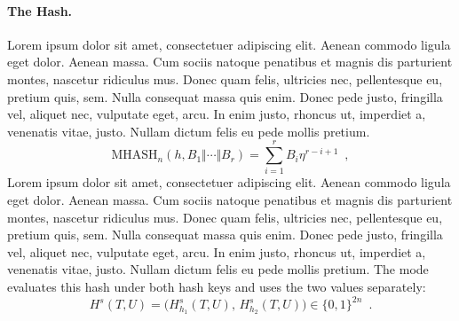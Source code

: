 \documentclass{article}
\begin{document}
\paragraph{The Hash.}
Lorem ipsum dolor sit amet, consectetuer adipiscing elit. Aenean commodo ligula
eget dolor. Aenean massa. Cum sociis natoque penatibus et magnis dis parturient
montes, nascetur ridiculus mus. Donec quam felis, ultricies nec, pellentesque
eu, pretium quis, sem. Nulla consequat massa quis enim. Donec pede justo,
fringilla vel, aliquet nec, vulputate eget, arcu. In enim justo, rhoncus ut,
imperdiet a, venenatis vitae, justo. Nullam dictum felis eu pede mollis pretium.
\[
 \textrm{MHASH}_n(h,B_1\Vert\cdots\Vert B_r)=\sum_{i=1}^rB_i\eta^{r-i+1}\enspace,
\]
Lorem ipsum dolor sit amet, consectetuer adipiscing elit. Aenean commodo ligula
eget dolor. Aenean massa. Cum sociis natoque penatibus et magnis dis parturient
montes, nascetur ridiculus mus. Donec quam felis, ultricies nec, pellentesque
eu, pretium quis, sem. Nulla consequat massa quis enim. Donec pede justo,
fringilla vel, aliquet nec, vulputate eget, arcu. In enim justo, rhoncus ut,
imperdiet a, venenatis vitae, justo. Nullam dictum felis eu pede mollis pretium.
The mode evaluates this hash under both hash keys and uses the two values separately:
\[
 H^s(T,U)=\bigl(H^s_{h_1}(T,U),\,H^s_{h_2}(T,U)\bigr)\in\{0,1\}^{2n}\enspace.
\]
\end{document}
